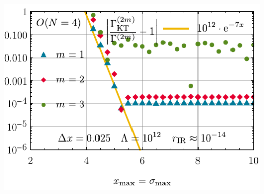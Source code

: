 	{\fullWidthTwoColumnFigureSpacing}
	{
		\includegraphics[width=\subcaptionFigureWidth]{0d/figures/sc_iii_on_4_deltax_25e-3_lambda_1e12_tir_60_errors_xmax.pdf} %
		\captionsetup{width=\subcaptionFigureWidth}%
		\caption{%
			The relative error for $\Gamma^{(2m)}$ for $m = 1, 2, 3$, for the $O ( 4 )$ model using the \uv{} potential \eqref{eq:testing_scenario_phi6}, as a function of the size of the computational interval $x_\mathrm{max}$. The cell size is $\Delta x = 0.025$. $\Gamma^{(2m)}$ are computed from the discrete values of the derivative of the \ir{} potential $u ( t_\mathrm{IR} = 60, \sigma )$ via the second-order accurate central finite-difference stencils \eqref{eq:derivative_1_central_error_2}, \eqref{eq:derivative_3_central_error_2}, and \eqref{eq:derivative_5_central_error_2} at $\sigma = 0$.
			We used the exponential regulator~\eqref{eq:exponential_regulator} with \uv{} scale $\Lambda = 10^{12}$.
			The yellow straight line $\propto\exp\del{-7\,x_\mathrm{max}}$ is for optical guidance.
		}%
		\label{fig:sc_iii_on_4_deltax_25e-3_lambda_1e12_tir_60_errors_xmax}%
	}
